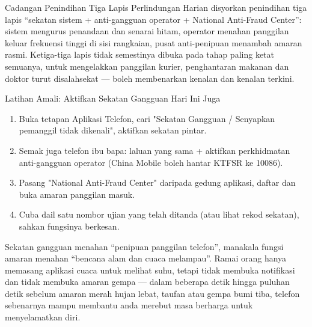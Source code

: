\begin{tcbinfo}{Cadangan Penindihan Tiga Lapis Perlindungan}
Harian disyorkan penindihan tiga lapis “sekatan sistem + anti-gangguan operator + National Anti-Fraud Center”: sistem mengurus penandaan dan senarai hitam, operator menahan panggilan keluar frekuensi tinggi di sisi rangkaian, pusat anti-penipuan menambah amaran rasmi. Ketiga-tiga lapis tidak semestinya dibuka pada tahap paling ketat semuanya, untuk mengelakkan panggilan kurier, penghantaran makanan dan doktor turut disalahsekat — boleh membenarkan kenalan dan kenalan terkini.

\end{tcbinfo}

\begin{tcbpractice}{Latihan Amali: Aktifkan Sekatan Gangguan Hari Ini Juga}
\begin{enumerate}
  \item Buka tetapan Aplikasi Telefon, cari "Sekatan Gangguan / Senyapkan pemanggil tidak dikenali", aktifkan sekatan pintar.
  \item Semak juga telefon ibu bapa: laluan yang sama + aktifkan perkhidmatan anti-gangguan operator (China Mobile boleh hantar KTFSR ke 10086).
  \item Pasang "National Anti-Fraud Center" daripada gedung aplikasi, daftar dan buka amaran panggilan masuk.
  \item Cuba dail satu nombor ujian yang telah ditanda (atau lihat rekod sekatan), sahkan fungsinya berkesan.
\end{enumerate}

\end{tcbpractice}


Sekatan gangguan menahan “penipuan panggilan telefon”, manakala fungsi amaran menahan “bencana alam dan cuaca melampau”. Ramai orang hanya memasang aplikasi cuaca untuk melihat suhu, tetapi tidak membuka notifikasi dan tidak membuka amaran gempa — dalam beberapa detik hingga puluhan detik sebelum amaran merah hujan lebat, taufan atau gempa bumi tiba, telefon sebenarnya mampu membantu anda merebut masa berharga untuk menyelamatkan diri.


